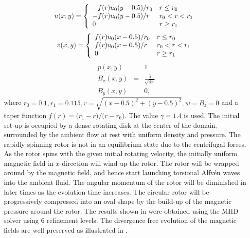 \begin{equation}
u(x,y)=\left\{ \begin{array}{l@{\quad}l}
            -f(r)u_0(y-0.5)/r_0 & r \leq r_0 \\
                    -f(r)u_0(y-0.5)/r   & r_0 < r < r_1\\
                     0                  & r \geq r_1
            \end{array} \right.\,
\end{equation}
\begin{equation}
v(x,y)=\left\{ \begin{array}{l@{\quad}l}
             f(r)u_0(x-0.5)/r_0 & r \leq r_0 \\
                     f(r)u_0(x-0.5)/r   & r_0 < r < r_1\\
                     0                  & r \geq r_1
           \end{array} \right.\,
\end{equation}
\begin{eqnarray}
p(x,y)   &=&1\\
B_x(x,y) &=&\frac{5}{\sqrt{4\pi}}\\
B_y(x,y) &=&0,
\end{eqnarray}
where $r_0=0.1,r_1=0.115,r=\sqrt{(x-0.5)^2+(y-0.5)^2},w=B_z=0$ and a taper function
$f(r)=\bigl(r_1-r\bigr)/\bigl(r-r_0\bigr)$. The value $\gamma=1.4$ is used.
The initial set-up is occupied by a dense rotating disk at the center of the domain,
surrounded by the ambient flow at rest with uniform density and pressure.
The rapidly spinning rotor is not in an equilibrium state due to the centrifugal forces.
As the rotor spins with the given initial rotating velocity,
the initially uniform magnetic field in $x$-direction will wind up
the rotor. The rotor will be wrapped around by the magnetic field,
and hence start launching torsional Alfv\'{e}n waves into the ambient fluid.
The angular momentum of the rotor will be diminished in later times as the evolution
time increases. The circular rotor will be progressively compressed into an oval shape by
the build-up of the magnetic pressure around the rotor. The results shown in
 were obtained using the  MHD 
solver using 6 refinement levels.
The divergence free evolution of the magnetic fields are well preserved as illustrated
in . 

